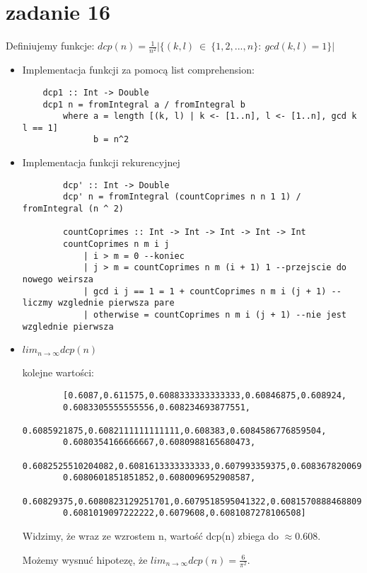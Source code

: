 \documentclass[11pt,a4paper]{article}
\begin{document}
\section*{zadanie 16}
Definiujemy funkcje: $dcp(n) = \frac{1}{n^2} |\{(k, l)\ \in\ \{1, 2, ..., n\}:\ gcd(k, l) = 1\}|$
\begin{itemize}
    \item Implementacja funkcji za pomocą list comprehension: \par
    \begin{verbatim}
    dcp1 :: Int -> Double
    dcp1 n = fromIntegral a / fromIntegral b
        where a = length [(k, l) | k <- [1..n], l <- [1..n], gcd k l == 1]
              b = n^2
    \end{verbatim}

    \item Implementacja funkcji rekurencyjnej
    \begin{verbatim}
        dcp' :: Int -> Double
        dcp' n = fromIntegral (countCoprimes n n 1 1) / fromIntegral (n ^ 2)
        
        countCoprimes :: Int -> Int -> Int -> Int -> Int
        countCoprimes n m i j
            | i > m = 0 --koniec
            | j > m = countCoprimes n m (i + 1) 1 --przejscie do nowego weirsza
            | gcd i j == 1 = 1 + countCoprimes n m i (j + 1) --liczmy wzglednie pierwsza pare
            | otherwise = countCoprimes n m i (j + 1) --nie jest wzglednie pierwsza
    \end{verbatim}

    \item $lim_{n \to \infty} dcp(n)$ \par
    kolejne wartości: \par
    \begin{verbatim}
        [0.6087,0.611575,0.6088333333333333,0.60846875,0.608924,
        0.6083305555555556,0.608234693877551,
        0.6085921875,0.6082111111111111,0.608383,0.6084586776859504,
        0.6080354166666667,0.6080988165680473,
        0.6082525510204082,0.6081613333333333,0.607993359375,0.6083678200692042,
        0.6080601851851852,0.6080096952908587,
        0.60829375,0.6080823129251701,0.6079518595041322,0.6081570888468809,
        0.6081019097222222,0.6079608,0.6081087278106508]
    \end{verbatim}
    Widzimy, że wraz ze wzrostem n, wartość dcp(n) zbiega do $\approx 0.608$. \par
    Możemy wysnuć hipotezę, że $lim_{n \to \infty} dcp(n) = \frac{6}{\pi^2}$.
\end{itemize}
\end{document}
